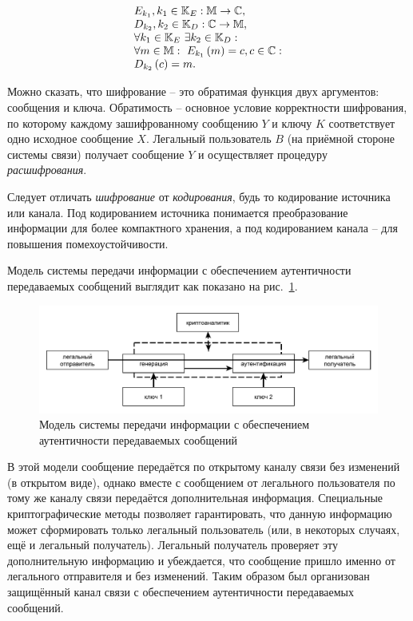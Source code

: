 \begin{equation}\label{eq:Encryption}\begin{array}{l}
	E_{k_1}, k_1 \in \mathbb{K}_E: \mathbb{M} \to \mathbb{C}, \\
	D_{k_2}, k_2 \in \mathbb{K}_D: \mathbb{C} \to \mathbb{M}, \\
	\forall k_1 \in \mathbb{K}_E ~ \exists k_2 \in \mathbb{K}_D: \\
	\forall m \in \mathbb{M}: ~ E_{k_1} \left( m \right) = c, c \in \mathbb{C}: \\
	D_{k_2} \left( c \right) = m.
\end{array}\end{equation}

Можно сказать, что шифрование -- это обратимая функция двух аргументов: сообщения и ключа. Обратимость -- основное условие корректности шифрования, по которому каждому зашифрованному сообщению $Y$ и ключу $K$ соответствует одно исходное сообщение $X$. Легальный пользователь $B$ (на приёмной стороне системы связи) получает сообщение $Y$ и осуществляет процедуру \emph{расшифрования}.

Следует отличать \emph{шифрование} от \emph{кодирования}, будь то кодирование источника или канала. Под кодированием источника понимается преобразование информации для более компактного хранения, а под кодированием канала -- для повышения помехоустойчивости.

Модель системы передачи информации с обеспечением аутентичности передаваемых сообщений выглядит как показано на рис.~\ref{pic:model-auten}.

\begin{figure}[!thb]
	\centering
	\includegraphics[width=1.0\textwidth]{pic/model-auten}
	\caption{Модель системы передачи информации с обеспечением аутентичности передаваемых сообщений\label{pic:model-auten}}
\end{figure}

В этой модели сообщение передаётся по открытому каналу связи без изменений (в открытом виде), однако вместе с сообщением от легального пользователя по тому же каналу связи передаётся дополнительная информация. Специальные криптографические методы позволяет гарантировать, что данную информацию может сформировать только легальный пользователь (или, в некоторых случаях, ещё и легальный получатель). Легальный получатель проверяет эту дополнительную информацию и убеждается, что сообщение пришло именно от легального отправителя и без изменений. Таким образом был организован защищённый канал связи с обеспечением аутентичности передаваемых сообщений. 

